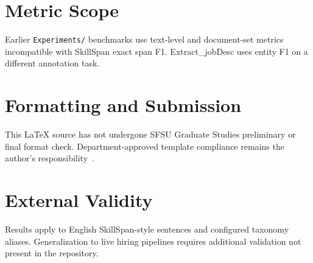 \section{Metric Scope}

Earlier \texttt{Experiments/} benchmarks use text-level and document-set metrics incompatible with SkillSpan exact span F1.
Extract\_jobDesc uses entity F1 on a different annotation task.

\section{Formatting and Submission}

This \LaTeX{} source has not undergone SFSU Graduate Studies preliminary or final format check.
Department-approved template compliance remains the author's responsibility~\cite{sfsugrad2026thesis}.

\section{External Validity}

Results apply to English SkillSpan-style sentences and configured taxonomy aliases.
Generalization to live hiring pipelines requires additional validation not present in the repository.
